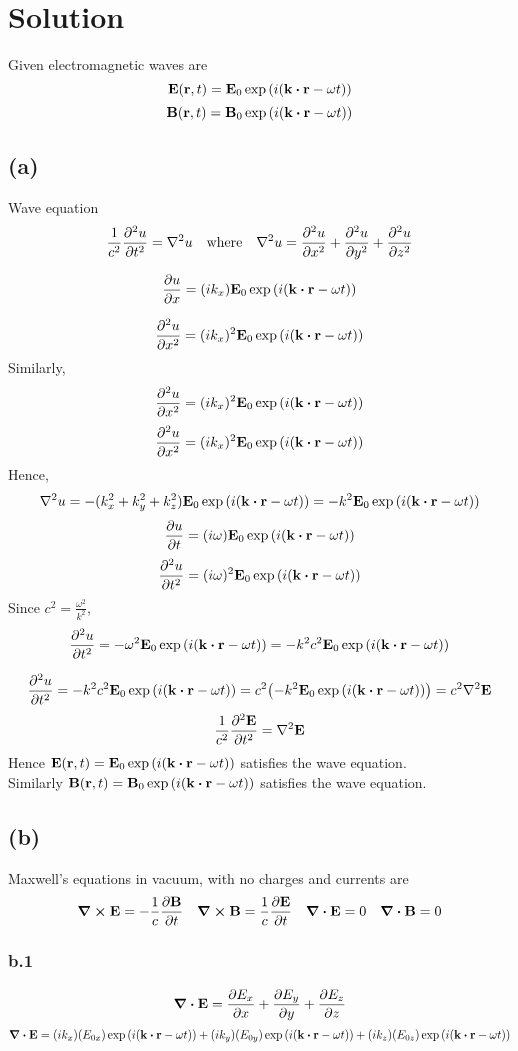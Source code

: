 \section*{Solution}

Given electromagnetic waves are \[\vb{E}(\vb{r},t)=\vb{E}_0\exp\qty(i\qty(\vb{k}\vdot\vb{r}-\omega{t}))\]
\[\vb{B}(\vb{r},t)=\vb{B}_0\exp\qty(i\qty(\vb{k}\vdot\vb{r}-\omega{t}))\]
\subsection*{(a)}
Wave equation \[\frac{1}{c^2}\pdv[2]{u}{t}=\laplacian{u}\qq{where}\laplacian{u}=\pdv[2]{u}{x}+\pdv[2]{u}{y}+\pdv[2]{u}{z}\]

\[\pdv{u}{x}=(ik_x)\vb{E}_0\exp\qty(i\qty(\vb{k}\vdot\vb{r}-\omega{t}))\]

\[\pdv[2]{u}{x}=(ik_x)^2\vb{E}_0\exp\qty(i\qty(\vb{k}\vdot\vb{r}-\omega{t}))\]
Similarly,
\[\pdv[2]{u}{x}=(ik_x)^2\vb{E}_0\exp\qty(i\qty(\vb{k}\vdot\vb{r}-\omega{t}))\]
\[\pdv[2]{u}{x}=(ik_x)^2\vb{E}_0\exp\qty(i\qty(\vb{k}\vdot\vb{r}-\omega{t}))\]
Hence,
\[\laplacian{u}=-(k^2_x+k^2_y+k^2_z)\vb{E}_0\exp\qty(i\qty(\vb{k}\vdot\vb{r}-\omega{t}))=-k^2\vb{E}_0\exp\qty(i\qty(\vb{k}\vdot\vb{r}-\omega{t}))\]
\[\pdv{u}{t}=(i\omega)\vb{E}_0\exp\qty(i\qty(\vb{k}\vdot\vb{r}-\omega{t}))\]
\[\pdv[2]{u}{t}=(i\omega)^2\vb{E}_0\exp\qty(i\qty(\vb{k}\vdot\vb{r}-\omega{t}))\]
Since $c^2=\frac{\omega^2}{k^2}$,
\[\pdv[2]{u}{t}=-\omega^2\vb{E}_0\exp\qty(i\qty(\vb{k}\vdot\vb{r}-\omega{t}))=-k^2c^2\vb{E}_0\exp\qty(i\qty(\vb{k}\vdot\vb{r}-\omega{t}))\]

\[\pdv[2]{u}{t}=-k^2c^2\vb{E}_0\exp\qty(i\qty(\vb{k}\vdot\vb{r}-\omega{t}))=c^2\qty(-k^2\vb{E}_0\exp\qty(i\qty(\vb{k}\vdot\vb{r}-\omega{t})))=c^2\laplacian{\vb{E}}\]
\[\frac{1}{c^2}\pdv[2]{\vb{E}}{t}=\laplacian{\vb{E}}\]
Hence $\vb{E}(\vb{r},t)=\vb{E}_0\exp\qty(i\qty(\vb{k}\vdot\vb{r}-\omega{t}))$ satisfies the wave equation.\\
Similarly $\vb{B}(\vb{r},t)=\vb{B}_0\exp\qty(i\qty(\vb{k}\vdot\vb{r}-\omega{t}))$ satisfies the wave equation.
\subsection*{(b)}
Maxwell's equations in vacuum, with no charges and currents are
\[\curl{\vb{E}}=-\frac{1}{c}\pdv{\vb{B}}{t}\quad\curl{\vb{B}}=\frac{1}{c}\pdv{\vb{E}}{t}\quad\div{\vb{E}}=0\quad\div{\vb{B}}=0\]
\subsubsection*{b.1}
\[\div{\vb{E}}=\pdv{E_x}{x}+\pdv{E_y}{y}+\pdv{E_z}{z}\]
\[\div{\vb{E}}=(ik_x)(E_{0x})\exp\qty(i\qty(\vb{k}\vdot\vb{r}-\omega{t}))+(ik_y)(E_{0y})\exp\qty(i\qty(\vb{k}\vdot\vb{r}-\omega{t}))+(ik_z)(E_{0z})\exp\qty(i\qty(\vb{k}\vdot\vb{r}-\omega{t}))\]